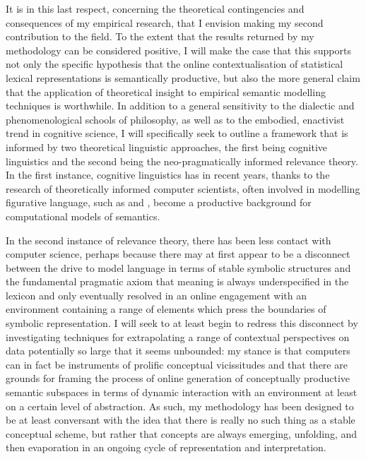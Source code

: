 It is in this last respect, concerning the theoretical contingencies and consequences of my empirical research, that I envision making my second contribution to the field.  To the extent that the results returned by my methodology can be considered positive, I will make the case that this supports not only the specific hypothesis that the online contextualisation of statistical lexical representations is semantically productive, but also the more general claim that the application of theoretical insight to empirical semantic modelling techniques is worthwhile.  In addition to a general sensitivity to the dialectic and phenomenological schools of philosophy, as well as to the embodied, enactivist trend in cognitive science, I will specifically seek to outline a framework that is informed by two theoretical linguistic approaches, the first being cognitive linguistics and the second being the neo-pragmatically informed relevance theory.  In the first instance, cognitive linguistics has in recent years, thanks to the research of theoretically informed computer scientists, often involved in modelling figurative language, such as \cite{Shutova} and \cite{Barnden}, become a productive background for computational models of semantics.

In the second instance of relevance theory, there has been less contact with computer science, perhaps because there may at first appear to be a disconnect between the drive to model language in terms of stable symbolic structures and the fundamental pragmatic axiom that meaning is always underspecified in the lexicon and only eventually resolved in an online engagement with an environment containing a range of elements which press the boundaries of symbolic representation.  I will seek to at least begin to redress this disconnect by investigating techniques for extrapolating a range of contextual perspectives on data potentially so large that it seems unbounded: my stance is that computers can in fact be instruments of prolific conceptual vicissitudes and that there are grounds for framing the process of online generation of conceptually productive semantic subspaces in terms of dynamic interaction with an environment at least on a certain level of abstraction.  As such, my methodology has been designed to be at least conversant with the idea that there is really no such thing as a stable conceptual scheme, but rather that concepts are always emerging, unfolding, and then evaporation in an ongoing cycle of representation and interpretation.

